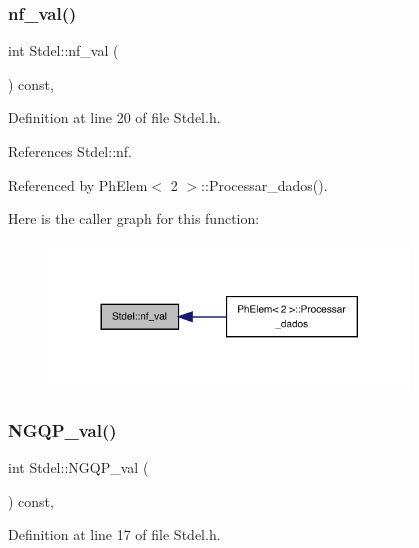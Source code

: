 \subsubsection{\texorpdfstring{nf\+\_\+val()}{nf\_val()}}
{\footnotesize\ttfamily int Stdel\+::nf\+\_\+val (\begin{DoxyParamCaption}{ }\end{DoxyParamCaption}) const\hspace{0.3cm}{\ttfamily [inline]}, {\ttfamily [inherited]}}



Definition at line 20 of file Stdel.\+h.



References Stdel\+::nf.



Referenced by Ph\+Elem$<$ 2 $>$\+::\+Processar\+\_\+dados().

Here is the caller graph for this function\+:
\nopagebreak
\begin{figure}[H]
\begin{center}
\leavevmode
\includegraphics[width=272pt]{classStdel_a2eed3ce0b73050e868989be78d918e5c_icgraph}
\end{center}
\end{figure}
\mbox{\label{classStdel_a2f964819235e0a55fd60733518b592f2}} 
\subsubsection{\texorpdfstring{N\+G\+Q\+P\+\_\+val()}{NGQP\_val()}}
{\footnotesize\ttfamily int Stdel\+::\+N\+G\+Q\+P\+\_\+val (\begin{DoxyParamCaption}{ }\end{DoxyParamCaption}) const\hspace{0.3cm}{\ttfamily [inline]}, {\ttfamily [inherited]}}



Definition at line 17 of file Stdel.\+h.



